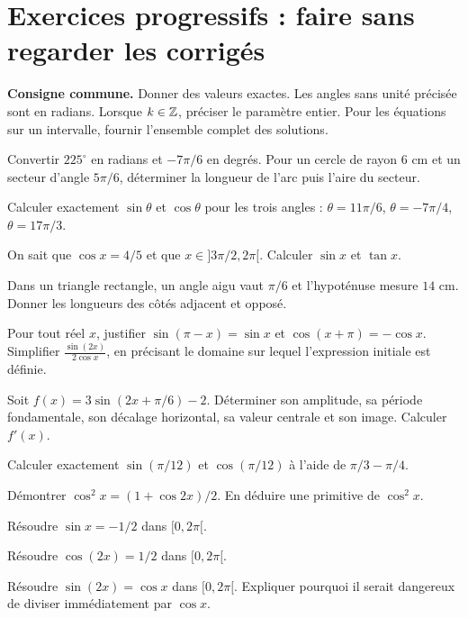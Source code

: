 \chapter{Exercices progressifs : faire sans regarder les corrigés}
\textbf{Consigne commune.} Donner des valeurs exactes. Les angles sans unité précisée sont en radians. Lorsque \(k\in\mathbb{Z}\), préciser le paramètre entier. Pour les équations sur un intervalle, fournir l'ensemble complet des solutions.

Convertir \(225^\circ\) en radians et \(-7\pi/6\) en degrés. Pour un cercle de rayon \(6\) cm et un secteur d'angle \(5\pi/6\), déterminer la longueur de l'arc puis l'aire du secteur.

Calculer exactement \(\sin\theta\) et \(\cos\theta\) pour les trois angles : \(\theta=11\pi/6\), \(\theta=-7\pi/4\), \(\theta=17\pi/3\).

On sait que \(\cos x=4/5\) et que \(x\in]3\pi/2,2\pi[\). Calculer \(\sin x\) et \(\tan x\).

Dans un triangle rectangle, un angle aigu vaut \(\pi/6\) et l'hypoténuse mesure \(14\) cm. Donner les longueurs des côtés adjacent et opposé.

Pour tout réel \(x\), justifier \(\sin(\pi-x)=\sin x\) et \(\cos(x+\pi)=-\cos x\). Simplifier \(\displaystyle\frac{\sin(2x)}{2\cos x}\), en précisant le domaine sur lequel l'expression initiale est définie.

Soit \(f(x)=3\sin(2x+\pi/6)-2\). Déterminer son amplitude, sa période fondamentale, son décalage horizontal, sa valeur centrale et son image. Calculer \(f'(x)\).

Calculer exactement \(\sin(\pi/12)\) et \(\cos(\pi/12)\) à l'aide de \(\pi/3-\pi/4\).

Démontrer \(\cos^2x=(1+\cos2x)/2\). En déduire une primitive de \(\cos^2x\).

Résoudre \(\sin x=-1/2\) dans \([0,2\pi[\).

Résoudre \(\cos(2x)=1/2\) dans \([0,2\pi[\).

Résoudre \(\sin(2x)=\cos x\) dans \([0,2\pi[\). Expliquer pourquoi il serait dangereux de diviser immédiatement par \(\cos x\).


